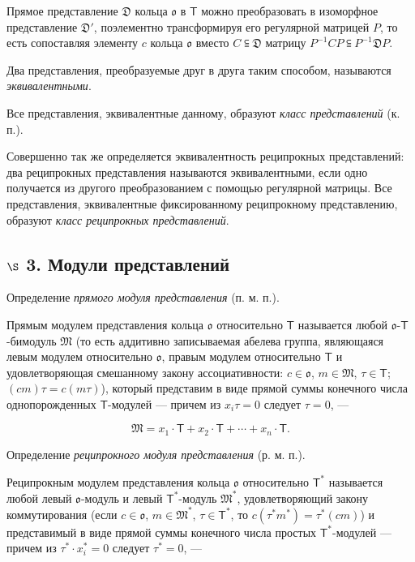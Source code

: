 \documentclass[11pt]{article}
\begin{document}
Прямое представление \(\mathfrak D\) кольца \(\mathfrak{o}\) в \(\mathsf T\) можно преобразовать в изоморфное представление \(\mathfrak D'\), поэлементно трансформируя его регулярной матрицей \(P\), то есть сопоставляя элементу \(c\) кольца \(\mathfrak{o}\) вместо \(C\subseteqq\mathfrak D\) матрицу \(P^{-1}CP\subseteqq P^{-1}\mathfrak D P\).

Два представления, преобразуемые друг в друга таким способом, называются \emph{эквивалентными}.

Все представления, эквивалентные данному, образуют \emph{класс представлений} (к. п.).

Совершенно так же определяется эквивалентность реципрокных представлений: два реципрокных представления называются эквивалентными, если одно получается из другого преобразованием с помощью регулярной матрицы. Все представления, эквивалентные фиксированному реципрокному представлению, образуют \emph{класс реципрокных представлений}.

\subsection*{\texorpdfstring{\(\S\) 3. Модули представлений}{\textbackslash S 3. Модули представлений}}\label{s-3.-darstellungsmoduln}

Определение \emph{прямого модуля представления} (п. м. п.).

Прямым модулем представления кольца \(\mathfrak{o}\) относительно \(\mathsf T\) называется любой \(\mathfrak{o}\)-\(\mathsf T\)-бимодуль \(\mathfrak M\) (то есть аддитивно записываемая абелева группа, являющаяся левым модулем относительно \(\mathfrak{o}\), правым модулем относительно \(\mathsf T\) и удовлетворяющая смешанному закону ассоциативности: \(c\in\mathfrak{o}\), \(m\in\mathfrak M\), \(\tau\in\mathsf T\); \((cm)\tau=c(m\tau)\)), который представим в виде прямой суммы конечного числа однопорожденных \(\mathsf T\)-модулей --- причем из \(x_i\tau=0\) следует \(\tau=0\), ---

\[
\mathfrak M=x_1\cdot\mathsf T+x_2\cdot\mathsf T+\cdots+x_n\cdot\mathsf T.
\]

Определение \emph{реципрокного модуля представления} (р. м. п.).

Реципрокным модулем представления кольца \(\mathfrak{o}\) относительно \(\mathsf T^*\) называется любой левый \(\mathfrak{o}\)-модуль и левый \(\mathsf T^*\)-модуль \(\mathfrak M^*\), удовлетворяющий закону коммутирования (если \(c\in\mathfrak{o}\), \(m\in\mathfrak M^*\), \(\tau\in\mathsf T^*\), то \(c(\tau^*m^*)=\tau^*(cm)\)) и представимый в виде прямой суммы конечного числа простых \(\mathsf T^*\)-модулей --- причем из \(\tau^*\cdot x_i^*=0\) следует \(\tau^*=0\), ---
\end{document}
